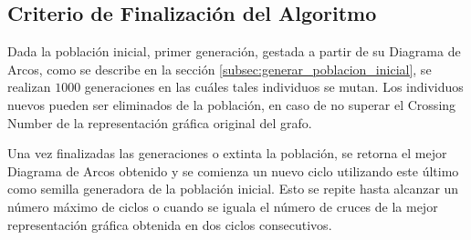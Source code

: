 	\subsection{Criterio de Finalización del Algoritmo }
	Dada la población inicial, primer generación, gestada  a partir de su Diagrama de Arcos, como se describe  en la sección \ref{subsec:generar_poblacion_inicial}, se realizan $1000$ generaciones en las cuáles tales individuos se mutan. Los individuos nuevos pueden ser eliminados de la  población, en caso de no superar el Crossing Number de la representación gráfica original del grafo.
	
	Una vez finalizadas las generaciones o extinta la población, se retorna el mejor Diagrama de Arcos obtenido y se comienza un nuevo ciclo utilizando este último como semilla generadora de la población inicial. Esto se repite hasta alcanzar un número máximo de ciclos  o cuando se iguala el número de cruces de  la mejor representación gráfica obtenida en dos ciclos consecutivos.
	
	
	
	
	
	
	

